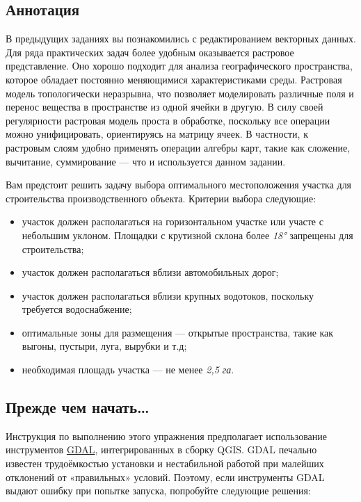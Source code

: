 \documentclass[
  12pt,
]{book}
\begin{document}
\hypertarget{weighted-overlay-annotation}{%
\subsection{Аннотация}\label{weighted-overlay-annotation}}

В предыдущих заданиях вы познакомились с редактированием векторных данных. Для ряда практических задач более удобным оказывается растровое представление. Оно хорошо подходит для анализа географического пространства, которое обладает постоянно меняющимися характеристиками среды. Растровая модель топологически неразрывна, что позволяет моделировать различные поля и перенос вещества в пространстве из одной ячейки в другую. В силу своей регулярности растровая модель проста в обработке, поскольку все операции можно унифицировать, ориентируясь на матрицу ячеек. В частности, к растровым слоям удобно применять операции алгебры карт, такие как сложение, вычитание, суммирование --- что и используется данном задании.

Вам предстоит решить задачу выбора оптимального местоположения участка для строительства производственного объекта. Критерии выбора следующие:

\begin{itemize}
\item
  участок должен располагаться на горизонтальном участке или участе с небольшим уклоном. Площадки с крутизной склона более \emph{18°} запрещены для строительства;
\item
  участок должен располагаться вблизи автомобильных дорог;
\item
  участок должен располагаться вблизи крупных водотоков, поскольку требуется водоснабжение;
\item
  оптимальные зоны для размещения --- открытые пространства, такие как выгоны, пустыри, луга, вырубки и т.д;
\item
  необходимая площадь участка --- не менее \emph{2,5 га}.
\end{itemize}

\hypertarget{weighted-overlay-warning}{%
\subsection{Прежде чем начать\ldots{}}\label{weighted-overlay-warning}}

Инструкция по выполнению этого упражнения предполагает использование инструментов \href{https://gdal.org/}{GDAL}, интегрированных в сборку QGIS. GDAL печально известен трудоёмкостью установки и нестабильной работой при малейших отклонений от «правильных» условий. Поэтому, если инструменты GDAL выдают ошибку при попытке запуска, попробуйте следующие решения:
\end{document}
